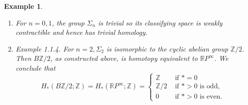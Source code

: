 \documentclass{book}
\newtheorem{example}{Example}
\begin{document}
\begin{example}
    \begin{enumerate}
        \item For $n=0,1$, the group $\Sigma_n$ is trivial so its classifying space is weakly contractible and hence has trivial homology.
        \item Example 1.1.4. For $n=2, \Sigma_2$ is isomorphic to the cyclic abelian group $\mathbb{Z} / 2$. Then $B \mathbb{Z} / 2$, as constructed above, is homotopy equivalent to $\mathbb{R} P^{\infty}$. We conclude that
        $$
        H_*(B \mathbb{Z} / 2 ; \mathbb{Z})=H_*\left(\mathbb{R} P^{\infty} ; \mathbb{Z}\right)= \begin{cases}\mathbb{Z} & \text { if } *=0 \\ \mathbb{Z} / 2 & \text { if } *>0 \text { is odd, } \\ 0 & \text { if } *>0 \text { is even. }\end{cases}
        $$
        
    \end{enumerate}
\end{example}








\printbibliography %
\end{document}
